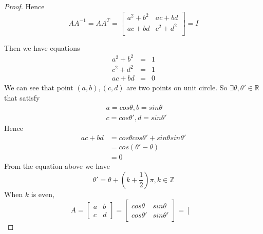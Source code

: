 \documentclass[12pt]{article}
\newcommand{\Z}{\mathbb{Z}}
\newcommand{\R}{\mathbb{R}}
\begin{document}
\begin{enumerate}[1)]
\begin {enumerate}[(a)]
\begin{enumerate}[(i)]
\begin{proof}
               Hence $$ AA^{-1} = AA^{T} = \left[
                        \begin{matrix}
                            a^{2} + b^{2} & ac + bd \\
                            ac + bd & c^{2} + d^{2} \\
                        \end{matrix}
                    \right] = I$$

               Then we have equations
                	\begin{eqnarray*}
                    	a^{2} + b^{2} & = & 1 \\
                        c^{2} + d^{2} & = & 1 \\
                        ac + bd & = & 0
                    \end{eqnarray*}
               We can see that point $(a, b), (c ,d)$ are two points on unit circle. So $\exists \theta, \theta' \in \R$ that satisfy
               		\begin{eqnarray*}
                    	&a = cos\theta , b = sin\theta\\
                        &c = cos\theta' , d = sin\theta'
                    \end{eqnarray*}
               	Hence
                	\begin{align*}
                    	ac + bd & = cos\theta cos\theta' + sin\theta sin\theta'\\
                        & = cos(\theta' - \theta) \\
                        & = 0
                    \end{align*}
                From the equation above we have
                $$ \theta' = \theta + (k + \frac{1}{2})\pi, k\in \Z$$
                When $k$ is even, 
               	$$ A = \left[
                        \begin{matrix}
                            a & b \\
                            c & d
                        \end{matrix}
                    \right]
                    =  \left[
                        \begin{matrix}
                            cos\theta & sin\theta \\
                            cos\theta' & sin\theta'
                        \end{matrix}
                    \right]
                   = \left[
                        \begin{matrix}

\end{matrix}$$
\end{proof}
\end{enumerate}
\end{enumerate}
\end{enumerate}
\end{document}
